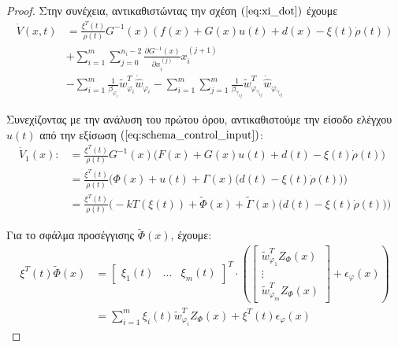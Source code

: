 \begin{proof}
Στην συνέχεια, αντικαθιστώντας την σχέση $(\ref{eq:xi_dot})$ έχουμε
\begin{equation}
	\begin{split}
	\dot{V}(x,t) &= 
	\frac{\xi^T(t)} {\rho(t)} G^{-1}(x) \left( f(x) + G(x)u(t) + d(x) - \xi(t)\dot{\rho}(t) \right)  \\
	&+ \sum_{i=1}^{m} \sum_{j=0}^{n_i - 2} 
	\frac{\partial G^{-1}(x) }{\partial x_i^{(j)}} x_i^{(j +1)}\\
	& - \sum_{i=1}^{m} \frac{1}{\beta_{\varphi_i} }
	\tilde{w}_{\varphi_i}^{T} \dot{\hat{w}}_{\varphi_i} 
	- \sum_{i=1}^{m} \sum_{j=1}^{m} \frac{1}{\beta_{\gamma_{ij}}}
	\tilde{w}_{\varphi_{\gamma_{ij}}}^{T} \dot{\hat{w}}_{\varphi_{\gamma_{ij}}}
	\end{split}
	\label{eq:scheme_lyap_derivative_2}
\end{equation}

Συνεχίζοντας με την ανάλυση του πρώτου όρου, αντικαθιστούμε την είσοδο ελέγχου $u(t)$ από την εξίσωση $(\ref{eq:schema_control_input})$:
\begin{equation*}
\begin{split}
	\dot{V}_1(x) :&= \frac{\xi^T(t)} {\rho(t)} G^{-1}(x) \Big( F(x) + G(x)u(t) + d(t) - \xi(t)\dot{\rho}(t) \Big)  \\
	 &=\frac{\xi^T(t)} {\rho(t)} \Big( \Phi(x) + u(t) 
	+  \Gamma(x) \big( d(t) - \xi(t)\dot{\rho}(t) \big)  \Big) \\
	 &=\frac{\xi^T(t)} {\rho(t)} \Big( -k T(\xi(t)) + \tilde{\Phi}(x) + \tilde{\Gamma}(x) \big( d(t) - \xi(t)\dot{\rho}(t) \big)  \Big)
\end{split}
\end{equation*}

Για το σφάλμα προσέγγισης $\tilde{\Phi}(x)$, έχουμε:
\begin{equation}
\begin{split}
	\xi^T(t) \tilde{\Phi}(x) &= 
	\begin{bmatrix}
	\xi_1(t) & \dots & \xi_m(t)
	\end{bmatrix}^T \cdot 
	\left(
	\begin{bmatrix}
	\tilde{w}_{\varphi_1}^{T} Z_{\varPhi}(x) \\
	\vdots \\
	\tilde{w}_{\varphi_m}^{T} Z_{\varPhi}(x) 
	\end{bmatrix}
	+ \epsilon_{\varphi}(x)
	\right) \\
	&= \sum_{i=1}^{m} \xi_i(t) \tilde{w}_{\varphi_i}^{T} Z_{\varPhi}(x) 
	  + \xi^T(t) \epsilon_{\varphi}(x)
\end{split}
\label{eq:phi_tilde_expand}
\end{equation}


\end{proof}
